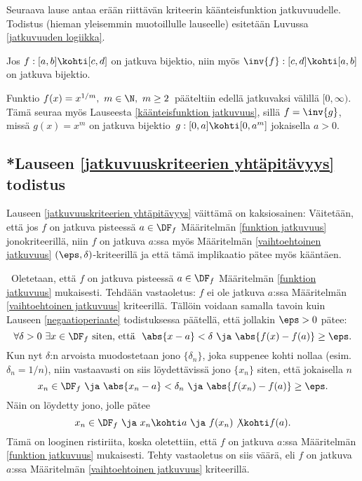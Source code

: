 Seuraava lause antaa erään riittävän kriteerin käänteisfunktion jatkuvuudelle. Todistus
(hieman yleisemmin muotoillulle lauseelle) esitetään Luvussa \ref{jatkuvuuden logiikka}.
\begin{*Lause} \label{käänteisfunktion jatkuvuus}
 Jos $f:[a,b] \kohti [c,d]$ on jatkuva bijektio, niin myös 
$\inv{f}:[c,d] \kohti [a,b]$ on jatkuva bijektio.
\end{*Lause} 
\begin{Exa} Funktio $f(x)=x^{1/m},\ m \in \N,\ m \ge 2\,$ pääteltiin edellä jatkuvaksi välillä 
$[0,\infty)$. Tämä seuraa myös Lauseesta \ref{käänteisfunktion jatkuvuus}, sillä $f=\inv{g}$,
missä $g(x)=x^m$ on jatkuva bijektio $\,g: [0,a] \kohti [0,a^m]$ jokaisella $a>0$. \loppu
\end{Exa}

\subsection*{*Lauseen \ref{jatkuvuuskriteerien yhtäpitävyys} todistus}

Lauseen \ref{jatkuvuuskriteerien yhtäpitävyys} väittämä on kaksiosainen: Väitetään, että
jos $f$ on jatkuva pisteessä $a\in\DF_f$ Määritelmän \ref{funktion jatkuvuus}
jonokriteerillä, niin $f$ on jatkuva $a$:ssa myös Määritelmän
\ref{vaihtoehtoinen jatkuvuus} $(\eps,\delta)$-kriteerillä ja että tämä
implikaatio pätee myös kääntäen.
 
\tod\, \fbox{$\impl$} Oletetaan, että $f$ on jatkuva pisteessä $a\in\DF_f$  Määritelmän 
\ref{funktion jatkuvuus} mukaisesti. Tehdään vastaoletus: $f$ ei ole jatkuva $a$:ssa
Määritelmän \ref{vaihtoehtoinen jatkuvuus} kriteerillä. Tällöin voidaan
samalla tavoin kuin Lauseen \ref{negaatioperiaate} todistuksessa päätellä, että jollakin 
$\eps>0$ pätee:
\[
\forall \delta>0 \ \exists x\in\DF_f\ \text{siten, että}\ \ 
                   \abs{x-a}<\delta \ \ja\ \abs{f(x)-f(a)}\ge\eps.
\]
Kun nyt $\delta$:n arvoista muodostetaan jono $\{\delta_n\}$, joka suppenee kohti nollaa 
(esim.\ $\delta_n=1/n$), niin vastaavasti on siis löydettävissä jono $\{x_n\}$ siten, että
jokaisella $n$
\[
x_n\in\DF_f\ \ja\ \abs{x_n-a}<\delta_n \ \ja \ \abs{f(x_n)-f(a)}\ge\eps.
\]
Näin on löydetty jono, jolle pätee
\[
x_n\in\DF_f\ \ja\ x_n \kohti a\ \ja\ f(x_n) \not\kohti f(a).
\]
Tämä on looginen ristiriita, koska oletettiin, että $f$ on jatkuva $a$:ssa Määritelmän
\ref{funktion jatkuvuus} mukaisesti. Tehty vastaoletus on siis väärä, eli $f$ on jatkuva
$a$:ssa Määritelmän \ref{vaihtoehtoinen jatkuvuus} kriteerillä. 

